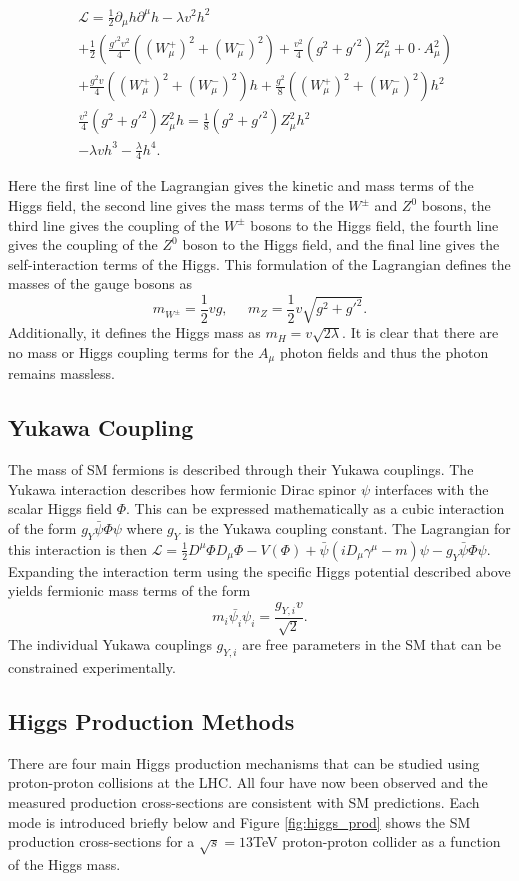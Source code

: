 \begin{align*}\nonumber
& \mathcal{L} = \frac{1}{2}\partial_{\mu}h\partial^{\mu}h - \lambda v^2h^2 \\
& + \frac{1}{2}(\frac{g'^2v^2}{4}((W^+_{\mu})^2+(W^-_{\mu})^2) +  \frac{v^2}{4}(g^2+g'^2)Z^2_{\mu} + 0\cdot A^2_{\mu}) \\
& + \frac{g^2v}{4}((W^+_{\mu})^2+(W^-_{\mu})^2)h + \frac{g^2}{8}((W^+_{\mu})^2+(W^-_{\mu})^2)h^2 \\
& \frac{v^2}{4}(g^2+g'^2)Z_{\mu}^2h = \frac{1}{8}(g^2+g'^2)Z_{\mu}^2h^2 \\
& - \lambda v h^3 - \frac{\lambda}{4}h^4.
\end{align*}

Here the first line of the Lagrangian gives the kinetic and mass terms of the Higgs field, the second line gives the mass terms of the $W^{\pm}$ and $Z^0$ bosons, the third line gives the coupling of the $W^{\pm}$ bosons to the Higgs field, the fourth line gives the coupling of the $Z^0$ boson to the Higgs field, and the final line gives the self-interaction terms of the Higgs.  This formulation of the Lagrangian defines the masses of the gauge bosons as
$$
m_{W^{\pm}}=\frac{1}{2}vg, \; \; \; \; \; m_Z=\frac{1}{2}v\sqrt{g^2+g'^2}.
$$
Additionally, it defines the Higgs mass as $m_H=v\sqrt{2\lambda}$. It is clear that there are no mass or Higgs coupling terms for the $A_{\mu}$ photon fields and thus the photon remains massless.

\subsection{Yukawa Coupling}\label{sec:yukawa}
The mass of SM fermions is described through their Yukawa couplings. The Yukawa interaction describes how fermionic Dirac spinor $\psi$ interfaces with the scalar Higgs field $\Phi$. This can be expressed mathematically as a cubic interaction of the form $g_Y\bar{\psi}\Phi\psi$ where $g_Y$ is the Yukawa coupling constant. The Lagrangian for this interaction is then $\mathcal{L}=\frac{1}{2}D^{\mu}\Phi D_{\mu}\Phi-V(\Phi)+\bar{\psi}(iD_{\mu}\gamma^{\mu}-m)\psi - g_Y\bar{\psi}\Phi\psi.$ Expanding the interaction term using the specific Higgs potential described above yields fermionic mass terms of the form 
$$ m_i\bar{\psi_i}\psi_i=\frac{g_{Y,i}v}{\sqrt{2}}.
$$
The individual Yukawa couplings $g_{Y,i}$ are free parameters in the SM that can be constrained experimentally. 

\subsection{Higgs Production Methods}\label{sec:higgs_prod}
There are four main Higgs production mechanisms that can be studied using proton-proton collisions at the LHC. All four have now been observed and the measured production cross-sections are consistent with SM predictions. Each mode is introduced briefly below and Figure \ref{fig:higgs_prod} shows the SM production cross-sections for a $\sqrt{s}=13$TeV proton-proton collider as a function of the Higgs mass. 

